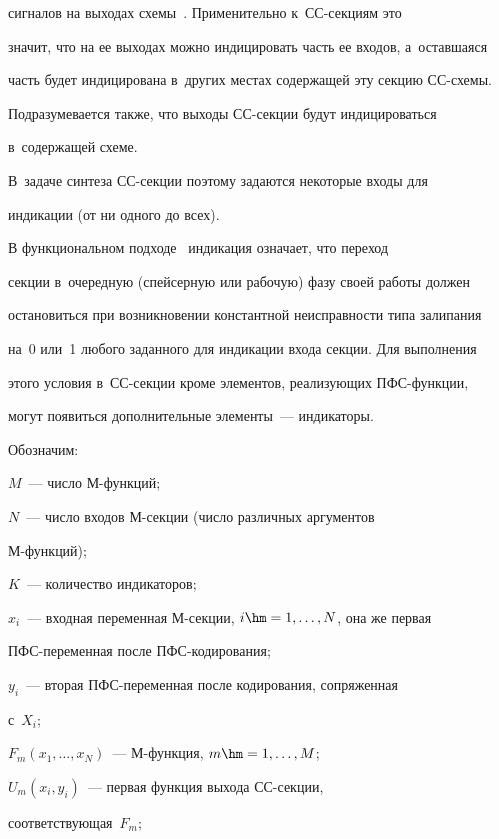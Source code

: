 сигналов на выходах схемы~\cite{1-pl}. Применительно к~СС-сек\-ци\-ям это 


значит, что на ее выходах можно индицировать часть ее входов, а~оставшаяся 


часть будет индицирована в~других местах содержащей эту секцию СС-схе\-мы. 


Подразумевается также, что выходы СС-сек\-ции будут индицироваться 


в~содержащей схеме.




   В~задаче синтеза СС-секции поэтому задаются некоторые входы для 


индикации (от ни одного до всех).


   


   В функциональном подходе~\cite{6-pl} индикация означает, что переход 


секции в~очередную (спейсерную или рабочую) фазу своей работы должен 


остановиться при возникновении константной неисправности типа залипания 


на~0 или~1 любого заданного для индикации входа секции. Для выполнения 


этого условия в~СС-сек\-ции кроме элементов, реализующих ПФС-функ\-ции, 


могут появиться дополнительные элементы~--- индикаторы.


   


   Обозначим:


   $M$~---  чис\-ло М-функ\-ций;


   $N$~--- чис\-ло входов М-сек\-ции (чис\-ло различных аргументов  


М-функ\-ций);


   $K$~--- количество индикаторов;


   $x_i$~--- входная переменная М-сек\-ции, $i\hm= 1,\ldots , N$, она же первая 


ПФС-пе\-ре\-мен\-ная после ПФС-ко\-ди\-ро\-ва\-ния;


   $y_i$~--- вторая ПФС-пе\-ре\-мен\-ная после кодирования, сопряженная 


с~$X_i$;


   $F_m (x_1,\ldots, x_N)$~--- М-функ\-ция, $m \hm= 1,\ldots, M$;


   $U_m (x_i, y_i)$~--- первая функция выхода СС-сек\-ции, 


соответствующая~$F_m$;


